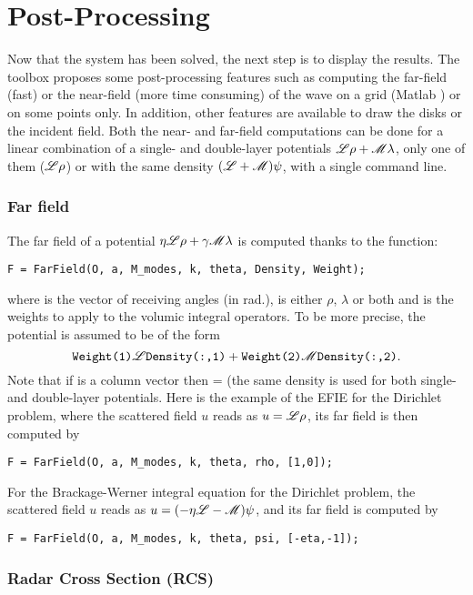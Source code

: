 \section{Post-Processing}

Now that the system has been solved, the next step is to display the results. The \mudiff toolbox proposes some post-processing features such as computing the far-field (fast) or the near-field (more time consuming) of the wave on a grid (Matlab ) or on some points only. In addition, other features are available to draw the disks or the incident field. Both the near- and far-field computations can be done for a linear combination of a single- and double-layer potentials ${\mathscr L}\rho + {\mathscr M}\lambda$, only one of them (\eg ${\mathscr L}\rho$) or with the same density $({\mathscr L}+{\mathscr M})\psi$, with a single command line.

\subsubsection{Far field}

The far field of a potential $\eta{\mathscr L}\rho + \gamma{\mathscr M}\lambda$ is computed thanks to the  function:
\begin{verbatim}
F = FarField(O, a, M_modes, k, theta, Density, Weight);
\end{verbatim}
where  is the vector of receiving angles (in rad.),  is either $\rho$, $\lambda$ or both and  is the weights to apply to the volumic integral operators. To be more precise, the potential is assumed to be of the form
$$
\texttt{Weight(1)}{\mathscr L}\texttt{Density(:,1)} + \texttt{Weight(2)}{\mathscr M}\texttt{Density(:,2)}.
$$
Note that if  is a column vector then  =  (the same density is used for both single- and double-layer potentials. Here is the example of the EFIE for the Dirichlet problem, where the scattered field $u$ reads as $u = {\mathscr L}\rho$, its far field is then computed by
\begin{verbatim}
F = FarField(O, a, M_modes, k, theta, rho, [1,0]);
\end{verbatim}
For the Brackage-Werner integral equation for the Dirichlet problem,  the scattered field $u$ reads as $u = (-\eta{\mathscr L}-{\mathscr M})\psi$, and its far field is computed by
\begin{verbatim}
F = FarField(O, a, M_modes, k, theta, psi, [-eta,-1]);
\end{verbatim}

\subsubsection{Radar Cross Section (RCS)}

